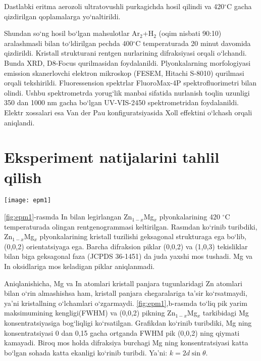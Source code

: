 \documentclass[14pt]{article}
\begin{document}
	
	Dastlabki eritma aerozoli ultratovushli purkagichda hosil qilindi va 420$^{\circ}$C gacha qizdirilgan qoplamalarga yo`naltirildi. 
	
	Shundan so`ng hosil bo`lgan mahsulotlar Ar$_{2}$+H$_{2}$ (oqim nisbati 90:10) aralashmasli bilan to`ldirilgan pechda 400$^{\circ}$C temperaturada 20 minut davomida qizdirildi. Kristall strukturani rentgen nurlarining difraksiyasi orqali o`lchandi. Bunda XRD, D8-Focus qurilmasidan foydalanildi. Plyonkalarning morfologiyasi emission skanerlovchi elektron mikroskop (FESEM, Hitachi S-8010) qurilmasi orqali tekshirildi. Fluoressension spektrlar FluoroMax-4P spektrofluorimetri bilan olindi. Ushbu spektrometrda yorug`lik manbai sifatida nurlanish toqlin uzunligi 350 dan 1000 nm gacha bo`lgan UV-VIS-2450 spektrometridan foydalanildi. Elektr xossalari esa Van der Pau konfiguratsiyasida Xoll effektini o`lchash orqali aniqlandi. 
		
\section{Eksperiment natijalarini tahlil qilish}

\begin{figure*}[h]
	\centering
	\texttt{[image: epm1]}
	\caption{Zn$_{1-x}$Mg$_{x}$ plyonkalarining rentgenogrammalari. b - yupqa Zn$_{1-x}$Mg$_{x}$ plyonkalarda piklarning Mg konsentratsiyasiga bog`liq ravishda siljishi }
	\label{fig:epm1}
\end{figure*}

\ref{fig:epm1}-rasmda In bilan legirlangan Zn$_{1-x}$Mg$_{x}$ plyonkalarining 420 $^{\circ}$C temperaturada olingan rentgenogrammasi keltirilgan. Rasmdan ko`rinib turibdiki, Zn$_{1-x}$Mg$_{x}$ plyonkalarining kristall tuzilishi geksagonal strukturaga ega bo`lib, (0,0,2) orientatsiyaga ega. Barcha difraksion piklar (0,0,2) va (1,0,3) tekisliklar bilan biga geksagonal faza (JCPDS 36-1451) da juda yaxshi mos tushadi. Mg va In oksidlariga mos keladigan piklar aniqlanmadi. 

Aniqlanishicha, Mg va In atomlari kristall panjara tugunlaridagi Zn atomlari bilan o`rin almashishsa ham, kristall panjara chegaralariga ta'sir ko`rsatmaydi, ya'ni kristallning o`lchamlari o`zgarmaydi. \ref{fig:epm1},b-rasmda to`liq pik yarim maksimumining kengligi(FWHM) va (0,0,2) pikning Zn$_{1-x}$Mg$_{x}$ tarkibidagi Mg konsentratsiyasiga bog`liqligi  ko`rsatilgan. Grafikdan ko`rinib turibdiki, Mg ning konsentratsiyasi 0 dan 0,15 gacha ortganda FWHM pik (0,0,2) ning qiymati kamayadi. Biroq mos holda difraksiya burchagi Mg ning konsentratsiyasi katta bo`lgan sohada katta ekanligi ko`rinib turibdi. Ya'ni: $k=2d\sin\theta$. 
	
\end{document}
